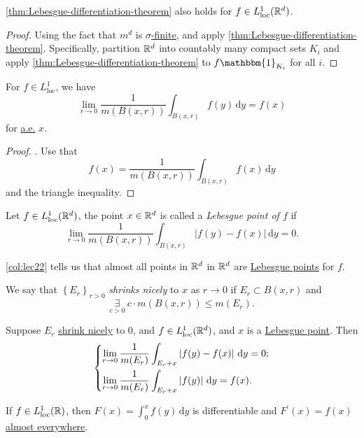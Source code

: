 \begin{corollary}\label{col:lec22}
	\autoref{thm:Lebesgue-differentiation-theorem} also holds for \(f\in L^1_{\text{loc}}(\mathbb{\MakeUppercase{r}} ^d)\).
\end{corollary}
\begin{proof}
	Using the fact that \(m^d\) is \hyperref[def:finite-measure]{\(\sigma \)-finite}, and apply \autoref{thm:Lebesgue-differentiation-theorem}.
	Specifically, partition \(\mathbb{\MakeUppercase{r}} ^d\) into countably many compact sets \(K_{i} \) and apply \autoref{thm:Lebesgue-differentiation-theorem}
	to \(f\mathbbm{1}_{K_{i} } \) for all \(i\).
\end{proof}

\begin{corollary}
	For \(f\in L^1_{\text{loc} }\), we have
	\[
		\lim\limits_{r \to 0} \frac{1}{m(B(x, r))}\int_{B(x, r)}^{} f(y) \,\mathrm{d}y = f(x)
	\]
	for \hyperref[def:mu-almost-everywhere]{a.e.} \(x\).
\end{corollary}
\begin{proof}
	. Use that
	\[
		f(x) = \frac{1}{m(B(x, r))}\int _{B(x, r)} f(x)\,\mathrm{d} y
	\]
	and the triangle inequality.
\end{proof}

\begin{definition}\label{def:Lebesgue-point}
	Let \(f\in L^1_{\text{loc}}(\mathbb{\MakeUppercase{r}} ^d)\), the point \(x\in \mathbb{\MakeUppercase{r}} ^d\) is called a \emph{Lebesgue point of \(f\)} if
	\[
		\lim\limits_{r \to 0} \frac{1}{m(B(x, r))}\int _{B(x, r)}\left\vert f(y) - f(x) \right\vert \,\mathrm{d} y = 0.
	\]
\end{definition}
\begin{remark}
	\autoref{col:lec22} tells us that almost all points in \(\mathbb{\MakeUppercase{r}} ^d\) in \(\mathbb{\MakeUppercase{r}} ^d\) are \hyperref[def:Lebesgue-point]{Lebesgue points}  for \(f\).
\end{remark}

\begin{definition}\label{def:shrink-nicely}
	We say that \(\left\{E_{r} \right\}_{r>0}\) \emph{shrinks nicely} to \(x\) as \(r\to 0\) if \(E_{r} \subset B(x, r)\) and
	\[
		\underset{c>0}{\exists } \ c\cdot m(B(x, r)) \leq m(E_{r} ).
	\]
\end{definition}

\begin{corollary}
	Suppose \(E_r\) \hyperref[def:shrink-nicely]{shrink nicely} to \(0\), and \(f\in L^1_{\text{loc}}(\mathbb{\MakeUppercase{r}} ^d)\), and \(x\) is a \hyperref[def:Lebesgue-point]{Lebesgue point}.
	Then
	\[
		\begin{dcases}
			\lim\limits_{r \to 0} \frac{1}{m(E_{r} )} \int _{E_{r} +x}\left\vert f(y) - f(x) \right\vert \,\mathrm{d} y= 0; \\
			\lim\limits_{r \to 0} \frac{1}{m(E_{r} )} \int _{E_{r} +x}\left\vert f(y) \right\vert \,\mathrm{d} y= f(x).
		\end{dcases}
	\]
\end{corollary}

\begin{corollary}
	If \(f\in L^1_{\text{loc} }(\mathbb{\MakeUppercase{r}} ) \), then \(F(x)= \int_{0}^x f(y)\,\mathrm{d} y\) is differentiable and \(F^\prime (x)=f(x)\) \hyperref[def:mu-almost-everywhere]{almost everywhere}.
\end{corollary}
